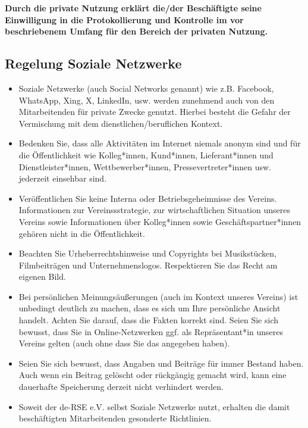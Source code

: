\documentclass[a4paper, fontsize=11pt]{scrartcl}
\begin{document}
{\large\textbf{Durch die private Nutzung erklärt die/der Beschäftigte seine Einwilligung in die Protokollierung und Kontrolle im vor beschriebenem Umfang für den Bereich der privaten Nutzung.}}

\subsection{Regelung Soziale Netzwerke}
\begin{itemize}
  \item Soziale Netzwerke (auch Social Networks genannt) wie z.B. Facebook, WhatsApp, Xing, X, LinkedIn, usw. werden zunehmend auch von den Mitarbeitenden für private Zwecke genutzt. Hierbei besteht die Gefahr der Vermischung mit dem dienstlichen/beruflichen Kontext.
  \item Bedenken Sie, dass alle Aktivitäten im Internet niemals anonym sind und für die Öffentlichkeit wie Kolleg*innen, Kund*innen, Lieferant*innen und Dienstleister*innen, Wettbewerber*innen, Pressevertreter*innen usw. jederzeit einsehbar sind.
  \item Veröffentlichen Sie keine Interna oder Betriebsgeheimnisse des Vereins. Informationen zur Vereinssstrategie, zur wirtschaftlichen Situation unseres Vereins sowie Informationen über Kolleg*innen sowie Geschäftspartner*innen gehören nicht in die Öffentlichkeit.
  \item Beachten Sie Urheberrechtshinweise und Copyrights bei Musikstücken, Filmbeiträgen und Unternehmenslogos. Respektieren Sie das Recht am eigenen Bild.
  \item Bei persönlichen Meinungsäußerungen (auch im Kontext unseres Vereins) ist unbedingt deutlich zu machen, dass es sich um Ihre persönliche Ansicht handelt. Achten Sie darauf, dass die Fakten korrekt sind. Seien Sie sich bewusst, dass Sie in Online-Netzwerken ggf. als Repräsentant*in unseres Vereins gelten (auch ohne dass Sie das angegeben haben).
  \item Seien Sie sich bewusst, dass Angaben und Beiträge für immer Bestand haben. Auch wenn ein Beitrag gelöscht oder rückgängig gemacht wird, kann eine dauerhafte Speicherung derzeit nicht verhindert werden.
  \item Soweit der de-RSE e.V. selbst Soziale Netzwerke nutzt, erhalten die damit beschäftigten Mitarbeitenden gesonderte Richtlinien.
\end{itemize}
\end{document}
